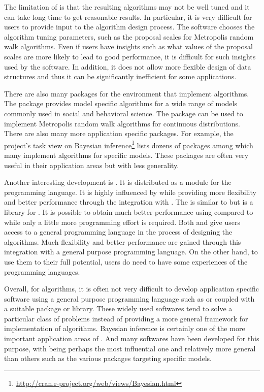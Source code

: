 The limitation of \bugs is that the resulting algorithms may not be well tuned and it can take  long time to get reasonable results. In particular, it is very difficult for users to provide input to the algorithm design process. The software chooses the algorithm tuning parameters, such as the proposal scales for Metropolis random walk algorithms. Even if users have insights such as what values of the proposal scales are more likely to lead to good performance, it is difficult for such insights  used by the software. In addition, it does not allow more flexible design of data structures and thus it can be significantly inefficient for some applications.

There are also many packages for the \rlang environment that implement \mcmc algorithms. The \rmcmcpack \cite{rmcmcpack} package provides model specific \mcmc algorithms for a wide range of models commonly used in social and behavioral science. The \rmcmc \cite{rmcmc} package can be used to implement Metropolis random walk algorithms for continuous distributions. There are also many more application specific packages. For example, the \rlang project's task view on Bayesian inference\footnote{\url{http://cran.r-project.org/web/views/Bayesian.html}} lists dozens of packages among which many implement \mcmc algorithms for specific models. These packages are often very useful in their application areas but with less generality.

Another interesting development is \pymc \cite{pymc}. It is distributed as a module for the \python programming language. It is highly influenced by \bugs while providing more flexibility and better performance through the integration with \python. The \cppbugs \cite{cppbugs} is similar to \pymc but is a library for \cpp. It is possible to obtain much better performance using \cppbugs compared to \bugs while only a little more programming effort is required. Both \pymc and \cppbugs give users access to a general programming language in the process of designing the algorithms. Much flexibility and better performance are gained through this integration with a general purpose programming language. On the other hand, to use them to their full potential, users do need to have some experiences of the programming languages.

Overall, for \mcmc algorithms, it is often not very difficult to develop application specific software using a general purpose programming language such as \rlang or \cpp coupled with a suitable package or library. These widely used softwares tend to solve a particular class of problems instead of providing a more general framework for implementation of algorithms. Bayesian inference is certainly one of the more important application areas of \mcmc. And many softwares have been developed for this purpose, with \bugs being perhaps the most influential one and relatively more general than others such as the various \rlang packages targeting specific models.

